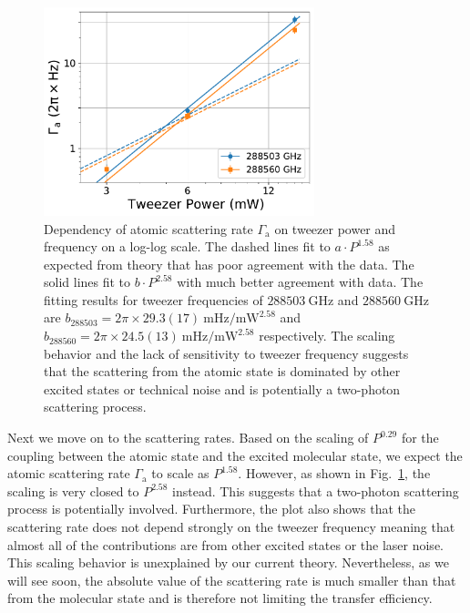 \begin{figure}
  \centering
  \includegraphics[width=0.7\textwidth]{figures/raman_transfer_scatter_scaling_atom.pdf}
  \caption[Atomic scattering rate as a function of tweezer power and frequency]{
    Dependency of atomic scattering rate $\Gamma_{\mathrm{a}}$
    on tweezer power and frequency on a log-log scale.
    The dashed lines fit to $a\cdot P^{1.58}$ as expected from theory
    that has poor agreement with the data.
    The solid lines fit to $b\cdot P^{2.58}$ with much better agreement with data.
    The fitting results for tweezer frequencies of
    $288503~\mathrm{GHz}$ and $288560~\mathrm{GHz}$ are
    $b_{288503}=2\pi\times29.3(17)~\mathrm{mHz/mW^{2.58}}$
    and $b_{288560}=2\pi\times24.5(13)~\mathrm{mHz/mW^{2.58}}$ respectively.
    The scaling behavior and the lack of sensitivity to tweezer frequency
    suggests that the scattering from the atomic state is dominated
    by other excited states or technical noise
    and is potentially a two-photon scattering process.
    \label{fig:raman-transfer:results:scaling:gamma-atom}}
\end{figure}

Next we move on to the scattering rates.
Based on the scaling of $P^{0.29}$ for the coupling
between the atomic state and the excited molecular state,
we expect the atomic scattering rate $\Gamma_{\mathrm{a}}$ to scale as $P^{1.58}$.
However, as shown in Fig.~\ref{fig:raman-transfer:results:scaling:gamma-atom},
the scaling is very closed to $P^{2.58}$ instead.
This suggests that a two-photon scattering process is potentially involved.
Furthermore, the plot also shows that the scattering rate does not depend strongly
on the tweezer frequency meaning that almost all of the contributions
are from other excited states or the laser noise.
This scaling behavior is unexplained by our current theory.
Nevertheless, as we will see soon, the absolute value of the scattering rate
is much smaller than that from the molecular state
and is therefore not limiting the transfer efficiency.

